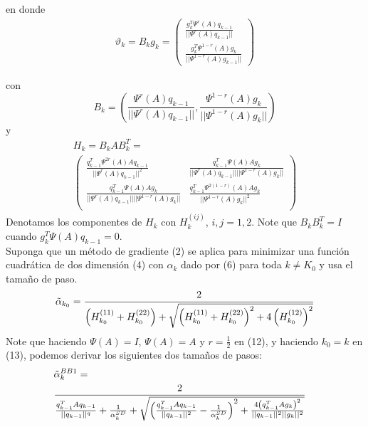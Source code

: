 \documentclass[conference]{IEEEtran}
\begin{document}
    en donde
    \begin{align}
        \vartheta_k = B_kg_k= \left(\begin{matrix}
    \frac{g_k^T \Psi^r(A)q_{k-1}}{||\Psi^r(A)q_{k-1}||} \\
    \frac{g_k^T \Psi^{1-r}(A)g_{k}}{||\Psi^{1-r}(A)g_{k-1}||}
    \end{matrix}\right)
    \end{align}

    con
    $$B_k= \left(\frac{\Psi^r(A)q_{k-1}}{||\Psi^r(A)q_{k-1}||}, \frac{\Psi^{1-r}(A)g_{k}}{||\Psi^{1-r}(A)g_{k}||}\right)$$
    y
    \begin{align}
       & H_k = B_kAB_k^T =& \\ \nonumber
        &\left(\begin{matrix}
    \frac{q_{k-1}^T \Psi^{2r}(A)Aq_{k-1}}{||\Psi^r(A)q_{k-1}||^2}  &  \frac{q_{k-1}^T \Psi(A)Ag_k}{||\Psi^r(A)q_{k-1}|| ||\Psi^{1-r}(A)g_k||}  \\
    \frac{q_{k-1}^T \Psi(A)Ag_k}{||\Psi^r(A)q_{k-1}|| ||\Psi^{1-r}(A)g_k||}   &  \frac{q_{k-1}^T \Psi^{2(1-r)}(A)Ag_{k}}{||\Psi^{1-r}(A)g_{k}||^2}  \\
    \end{matrix}\right)&
    \end{align}
    Denotamos los componentes de $ H_k$ con $H_k^{(ij)}$, $i,j=1,2$. Note que $B_k B_k^T = I$ cuando $g_k^T \Psi(A)q_{k-1} = 0$.\\
    Suponga que un método de gradiente (2) se aplica para minimizar una función cuadrática de dos dimensión (4) con $\alpha_k$ dado por (6) para toda $k \neq K_0$ y usa el tamaño de paso.
    \begin{align}
        \Tilde{\alpha}_{k_0} = \frac{2}{\left (H_{k_0}^{(11)} + H_{k_0}^{(22)} \right) + \sqrt{\left (H_{k_0}^{(11)} + H_{k_0}^{(22)} \right)^2 + 4\left(H_{k_0}^{(12)} \right)^2}}
    \end{align}
    Note que haciendo $\Psi(A)= I$, $\Psi(A)=A$ y $r=\frac{1}{2}$ en (12), y haciendo $k_0 = k$ en (13), podemos derivar los siguientes dos tamaños de pasos:
    \begin{align*}
        &\Tilde{\alpha}_k^{BB1} =& \\
        &\frac{2}{\frac{q_{k-1}^T A q_{k-1}}{||q_{k-1}||^q} + \frac{1}{\alpha_k^{SD}} + \sqrt{
        \left(\frac{q_{k-1}^T A q_{k-1}}{||q_{k-1}||^2} - \frac{1}{\alpha_k^{SD}}\right)^2 +
        \frac{4\left( q_{k-1}^T A g_k\right)^2}{||q_{k-1}||^2 ||g_k||^2}
        }}&
    \end{align*}
\end{document}
